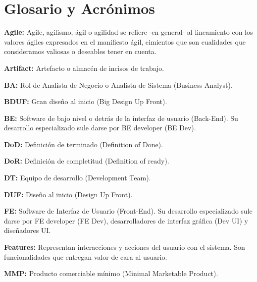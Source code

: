 \chapter{Glosario y Acrónimos}


  \begin{description}    
  
  \item {\textbf{Agile:} Agile, agilismo, ágil o agilidad se refiere -en general- al lineamiento con los valores ágiles expresados en el manifiesto ágil, cimientos que son cualidades que consideramos valiosas o deseables tener en cuenta.}
   
  \item {\textbf{Artifact:} Artefacto o almacén de incisos de trabajo.}  
  
  \item {\textbf{BA:} Rol de Analista de Negocio o Analista de Sistema (Business Analyst).}
  
  \item {\textbf{BDUF:} Gran diseño al inicio (Big Design Up Front).}  
  
  \item {\textbf{BE:} Software de bajo nivel o detrás de la interfaz de usuario (Back-End). Su desarrollo especializado sule darse por BE developer (BE Dev).}
 
  \item {\textbf{DoD:} Definición de terminado (Definition of Done).}
  
  \item {\textbf{DoR:} Definición de completitud (Definition of ready).}
  
  \item {\textbf{DT:} Equipo de desarrollo (Development Team).}
  
  \item {\textbf{DUF:} Diseño al inicio (Design Up Front).}

  \item {\textbf{FE:} Software de Interfaz de Usuario (Front-End). Su desarrollo especializado sule darse por FE developer (FE Dev), desarrolladores de interfaz gráfica (Dev UI) y diseñadores UI.}
  
  \item {\textbf{Features:} Representan interacciones y acciones del usuario con el sistema. Son funcionalidades que entregan valor de cara al usuario.}
  
  \item {\textbf{MMP:} Producto comerciable mínimo (Minimal Marketable Product).}
  

\end{description}

